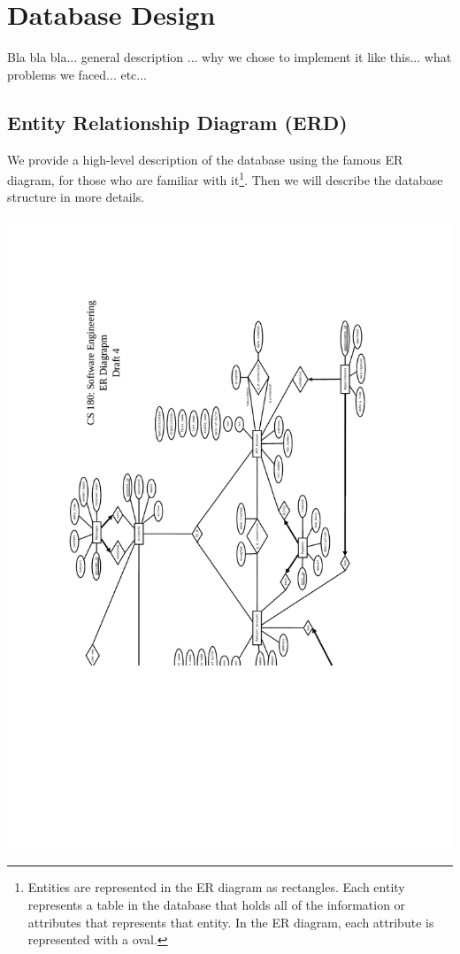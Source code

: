 \documentclass[12pt]{report}
\begin{document}
\section{Database Design}
Bla bla bla... general description ... why we chose to implement it like this... what problems we faced... etc...

\subsection{Entity Relationship Diagram (ERD)}
We provide a high-level description of the database using the famous ER diagram, for those who are familiar with it\footnote{Entities are represented in the ER diagram as rectangles.  Each entity represents a table in the database that holds all of the information or attributes that represents that entity.  In the ER diagram, each attribute is represented with a oval.}. Then we will describe the database structure in more details.

\includegraphics[scale=0.6,angle=180]{cs180_ER_draft4.pdf}
\end{document}
